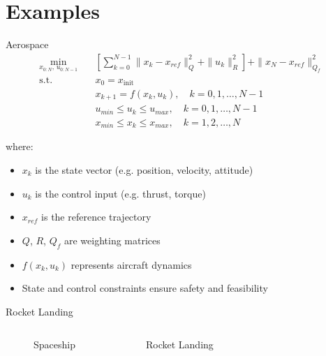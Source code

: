 \documentclass{beamer}
\begin{document}
\section{Examples}
    
\begin{frame}{Aerospace}
    \footnotesize
    \[
    \begin{aligned}
    \min_{x_{0:N},\, u_{0:N-1}} \quad & \left[ \sum_{k=0}^{N-1} \|x_k - x_{ref}\|_Q^2 + \|u_k\|_R^2 \right] + \|x_N - x_{ref}\|_{Q_f}^2 \\
    \text{s.t.} \quad & x_0 = x_{\text{init}} \\
    & x_{k+1} = f(x_k, u_k), \quad k = 0,1,\ldots,N-1 \\
    & u_{min} \leq u_k \leq u_{max}, \quad k = 0,1,\ldots,N-1 \\
    & x_{min} \leq x_k \leq x_{max}, \quad k = 1,2,\ldots,N
    \end{aligned}
    \]
    
    \vspace{0.5em}
    
    where:
    \begin{itemize}
        \item $x_k$ is the state vector (e.g. position, velocity, attitude)
        \item $u_k$ is the control input (e.g. thrust, torque)
        \item $x_{ref}$ is the reference trajectory
        \item $Q$, $R$, $Q_f$ are weighting matrices
        \item $f(x_k, u_k)$ represents aircraft dynamics
        \item State and control constraints ensure safety and feasibility
    \end{itemize}
    
    \vspace{0.5em}
    \end{frame}

\begin{frame}{Rocket Landing}
\begin{columns}
    \begin{figure}
        \centering
        \caption{Spaceship}
    \end{figure}
    
    \begin{figure}
        \centering
        \caption{Rocket Landing}
    \end{figure}
\end{columns}
\end{frame}
\end{document}
